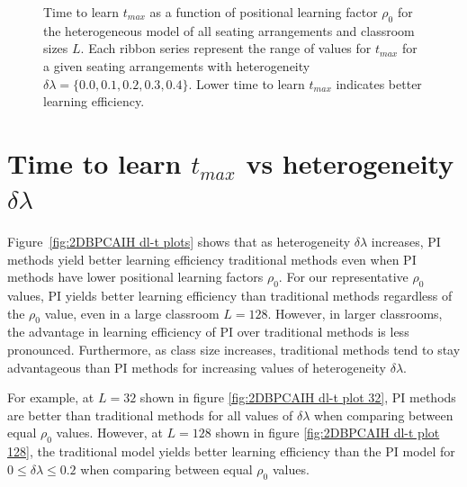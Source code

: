 \begin{figure}[htbp!]
   \caption[Positional learning factor $\rho_0$ dependence of time to learn $t_{max}$ for the heterogeneous classroom model for all SAs and classroom lengths $L$]{Time to learn $t_{max}$ as a function of positional learning factor $\rho_0$ for the heterogeneous model of all seating arrangements and classroom sizes $L$. 
   Each ribbon series represent the range of values for $t_{max}$ for a given seating arrangements with heterogeneity $\delta\lambda = \lbrace 0.0, 0.1, 0.2, 0.3, 0.4 \rbrace$.
   Lower time to learn $t_{max}$ indicates better learning efficiency.
   }
   \label{fig:2DBPCAIH t-rho ribbon plot}
\end{figure}

\newpage %

\section{Time to learn $t_{max}$ vs heterogeneity $\delta\lambda$}\label{sec:BPCAIH t vs dl}

Figure~\ref{fig:2DBPCAIH dl-t plots} shows that as heterogeneity $\delta\lambda$ increases, PI methods yield better learning efficiency traditional methods even when PI methods have lower positional learning factors $\rho_0$. For our representative $\rho_0$ values, PI yields better learning efficiency than traditional methods regardless of the $\rho_0$ value, even in a large classroom $L=128$. 
However, in larger classrooms, the advantage in learning efficiency of PI over traditional methods is less pronounced. 
Furthermore, as class size increases, traditional methods tend to stay advantageous than PI methods for increasing values of heterogeneity $\delta\lambda$.

For example, at $L=32$ shown in figure \ref{fig:2DBPCAIH dl-t plot 32}, PI methods are better than traditional methods for all values of $\delta\lambda$ when comparing between equal $\rho_0$ values. 
However, at $L=128$ shown in figure \ref{fig:2DBPCAIH dl-t plot 128}, the traditional model yields better learning efficiency than the PI model for $0 \leq \delta\lambda \leq 0.2$ when comparing between equal $\rho_0$ values.

